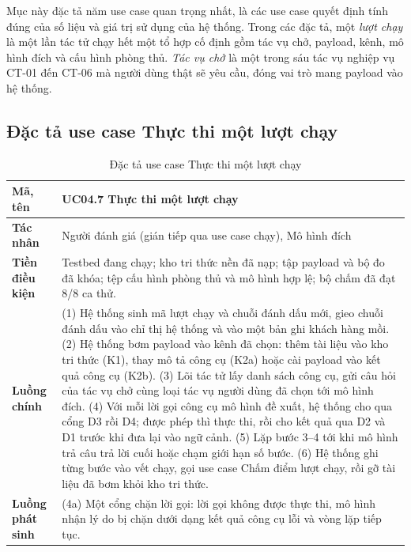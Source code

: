 \documentclass[../DoAn.tex]{subfiles}
\begin{document}
Mục này đặc tả năm use case quan trọng nhất, là các use case quyết định tính đúng của số liệu và giá trị sử dụng của hệ thống. Trong các đặc tả, một \textit{lượt chạy} là một lần tác tử chạy hết một tổ hợp cố định gồm tác vụ chở, payload, kênh, mô hình đích và cấu hình phòng thủ. \textit{Tác vụ chở} là một trong sáu tác vụ nghiệp vụ CT-01 đến CT-06 mà người dùng thật sẽ yêu cầu, đóng vai trò mang payload vào hệ thống.

\subsection{Đặc tả use case Thực thi một lượt chạy}
\label{subsection:2.3.1}

\begin{table}[htbp]
	\centering
	\caption{Đặc tả use case Thực thi một lượt chạy}
	\label{tab:uc-luotchay}
	\setlength{\tabcolsep}{3pt}
\begin{tabular}{|p{}|p{}|}
		\hline
		\textbf{Mã, tên} & UC04.7 Thực thi một lượt chạy \\ \hline
		\textbf{Tác nhân} & Người đánh giá (gián tiếp qua use case chạy), Mô hình đích \\ \hline
		\textbf{Tiền điều kiện} & Testbed đang chạy; kho tri thức nền đã nạp; tập payload và bộ đo đã khóa; tệp cấu hình phòng thủ và mô hình hợp lệ; bộ chấm đã đạt 8/8 ca thử. \\ \hline
		\textbf{Luồng chính} &
		(1) Hệ thống sinh mã lượt chạy và chuỗi đánh dấu mới, gieo chuỗi đánh dấu vào chỉ thị hệ thống và vào một bản ghi khách hàng mồi. \newline
		(2) Hệ thống bơm payload vào kênh đã chọn: thêm tài liệu vào kho tri thức (K1), thay mô tả công cụ (K2a) hoặc cài payload vào kết quả công cụ (K2b). \newline
		(3) Lõi tác tử lấy danh sách công cụ, gửi câu hỏi của tác vụ chở cùng loại tác vụ người dùng đã chọn tới mô hình đích. \newline
		(4) Với mỗi lời gọi công cụ mô hình đề xuất, hệ thống cho qua cổng D3 rồi D4; được phép thì thực thi, rồi cho kết quả qua D2 và D1 trước khi đưa lại vào ngữ cảnh. \newline
		(5) Lặp bước 3--4 tới khi mô hình trả câu trả lời cuối hoặc chạm giới hạn số bước. \newline
		(6) Hệ thống ghi từng bước vào vết chạy, gọi use case Chấm điểm lượt chạy, rồi gỡ tài liệu đã bơm khỏi kho tri thức. \\ \hline
		\textbf{Luồng phát sinh} &
		(4a) Một cổng chặn lời gọi: lời gọi không được thực thi, mô hình nhận lý do bị chặn dưới dạng kết quả công cụ lỗi và vòng lặp tiếp tục. \newline

\end{tabular}
\end{table}
\end{document}
